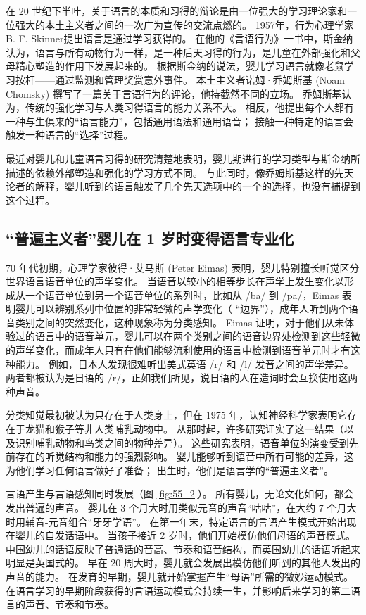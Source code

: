 在 20 世纪下半叶，关于语言的本质和习得的辩论是由一位强大的学习理论家和一位强大的本土主义者之间的一次广为宣传的交流点燃的。 1957年，行为心理学家B. F. Skinner提出语言是通过学习获得的。 在他的《言语行为》一书中，斯金纳认为，语言与所有动物行为一样，是一种后天习得的行为，是儿童在外部强化和父母精心塑造的作用下发展起来的。 根据斯金纳的说法，婴儿学习语言就像老鼠学习按杆——通过监测和管理奖赏意外事件。 本土主义者诺姆·乔姆斯基 (Noam Chomsky) 撰写了一篇关于言语行为的评论，他持截然不同的立场。 乔姆斯基认为，传统的强化学习与人类习得语言的能力关系不大。 相反，他提出每个人都有一种与生俱来的“语言能力”，包括通用语法和通用语音； 接触一种特定的语言会触发一种语言的“选择”过程。

最近对婴儿和儿童语言习得的研究清楚地表明，婴儿期进行的学习类型与斯金纳所描述的依赖外部塑造和强化的学习方式不同。 与此同时，像乔姆斯基这样的先天论者的解释，婴儿听到的语言触发了几个先天选项中的一个的选择，也没有捕捉到这个过程。

\subsection{“普遍主义者”婴儿在 1 岁时变得语言专业化}
70 年代初期，心理学家彼得·艾马斯 (Peter Eimas) 表明，婴儿特别擅长听觉区分世界语言语音单位的声学变化。 当语音以较小的相等步长在声学上发生变化以形成从一个语音单位到另一个语音单位的系列时，比如从 /ba/ 到 /pa/，Eimas 表明婴儿可以辨别系列中位置的非常轻微的声学变化（ “边界”），成年人听到两个语音类别之间的突然变化，这种现象称为分类感知。 Eimas 证明，对于他们从未体验过的语言中的语音单元，婴儿可以在两个类别之间的语音边界处检测到这些轻微的声学变化，而成年人只有在他们能够流利使用的语言中检测到语音单元时才有这种能力。 例如，日本人发现很难听出美式英语 /r/ 和 /l/ 发音之间的声学差异。 两者都被认为是日语的 /r/，正如我们所见，说日语的人在造词时会互换使用这两种声音。

分类知觉最初被认为只存在于人类身上，但在 1975 年，认知神经科学家表明它存在于龙猫和猴子等非人类哺乳动物中。 从那时起，许多研究证实了这一结果（以及识别哺乳动物和鸟类之间的物种差异）。 这些研究表明，语音单位的演变受到先前存在的听觉结构和能力的强烈影响。 婴儿能够听到语音中所有可能的差异，这为他们学习任何语言做好了准备； 出生时，他们是语言学的“普遍主义者”。

言语产生与言语感知同时发展（图 \ref{fig:55_2}）。 所有婴儿，无论文化如何，都会发出普遍的声音。 婴儿在 3 个月大时用类似元音的声音“咕咕”，在大约 7 个月大时用辅音-元音组合“牙牙学语”。 在第一年末，特定语言的言语产生模式开始出现在婴儿的自发话语中。 当孩子接近 2 岁时，他们开始模仿他们母语的声音模式。 中国幼儿的话语反映了普通话的音高、节奏和语音结构，而英国幼儿的话语听起来明显是英国式的。 早在 20 周大时，婴儿就会发展出模仿他们听到的其他人发出的声音的能力。 在发育的早期，婴儿就开始掌握产生“母语”所需的微妙运动模式。 在语言学习的早期阶段获得的言语运动模式会持续一生，并影响后来学习的第二语言的声音、节奏和节奏。

